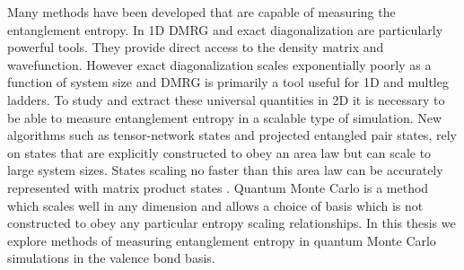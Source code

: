 Many methods have been developed that are capable of measuring the entanglement entropy. In 1D DMRG and exact diagonalization are particularly powerful tools. They provide direct access to the density matrix and wavefunction. However exact diagonalization scales exponentially poorly as a function of system size and DMRG is primarily a tool useful for 1D and multleg ladders. To study and extract these universal quantities in 2D it is necessary to be able to measure entanglement entropy in a scalable type of simulation. New algorithms such as tensor-network states and projected entangled pair states, rely on states that are explicitly constructed to obey an area law \cite{MERA,PEPS1,PEPS2} but can scale to large system sizes. States scaling no faster than this area law can be accurately represented with matrix product states \cite{MPS_DMRG}. Quantum Monte Carlo is a method which scales well in any dimension and allows a choice of basis which is not constructed to obey any particular entropy scaling relationships. In this thesis we explore methods of measuring entanglement entropy in quantum Monte Carlo simulations in the valence bond basis.



